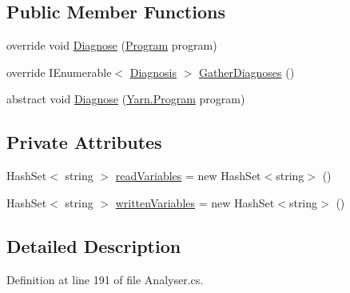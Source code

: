 \subsection*{Public Member Functions}
\begin{DoxyCompactItemize}
\item 
override void \hyperlink{a00163_aeac8f333d4dcc85f4d4a716bf8fea01f}{Diagnose} (\hyperlink{a00138}{Program} program)
\item 
override I\-Enumerable$<$ \hyperlink{a00087}{Diagnosis} $>$ \hyperlink{a00163_a107aecf707b130c4b733930a95f9154e}{Gather\-Diagnoses} ()
\item 
abstract void \hyperlink{a00050_aba4a36cb823b11ee491074e26477d084}{Diagnose} (\hyperlink{a00138}{Yarn.\-Program} program)
\end{DoxyCompactItemize}
\subsection*{Private Attributes}
\begin{DoxyCompactItemize}
\item 
Hash\-Set$<$ string $>$ \hyperlink{a00163_a6b542092ddce1b92c9455d60899518a9}{read\-Variables} = new Hash\-Set$<$string$>$ ()
\item 
Hash\-Set$<$ string $>$ \hyperlink{a00163_a0c2fe6eded1b10b135ca2469f5980a39}{written\-Variables} = new Hash\-Set$<$string$>$ ()
\end{DoxyCompactItemize}


\subsection{Detailed Description}


Definition at line 191 of file Analyser.\-cs.



